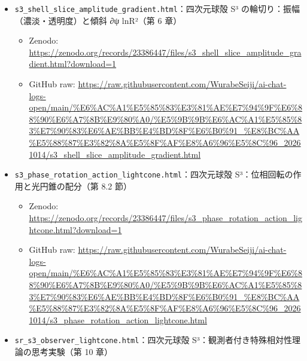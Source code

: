 \documentclass[
  a4paper,
]{ltjsarticle}
\providecommand{\tightlist}{%
  \setlength{\itemsep}{0pt}\setlength{\parskip}{0pt}}
\begin{document}
\begin{itemize}
  \begin{itemize}
  \tightlist
  \item
    Zenodo:
    \url{https://zenodo.org/records/23386447/files/sr_observer_lightcone_s1.html?download=1}
  \item
    GitHub raw:
    \url{https://raw.githubusercontent.com/WurabeSeiji/ai-chat-logs-open/main/\%E6\%AC\%A1\%E5\%85\%83\%E3\%81\%AE\%E7\%94\%9F\%E6\%88\%90\%E6\%A7\%8B\%E9\%80\%A0/\%E5\%86\%86\%E5\%91\%A8\%E4\%BD\%8F\%E6\%B0\%91_\%E5\%85\%89\%E5\%86\%86\%E9\%8C\%90\%E8\%AA\%AD\%E5\%87\%BA\%E3\%81\%97_20261014/sr_observer_lightcone_s1.html}
  \end{itemize}
\item
  \texttt{s3\_\allowbreak{}shell\_\allowbreak{}slice\_\allowbreak{}amplitude\_\allowbreak{}gradient.html}：四次元球殻 S³
  の輪切り：振幅（濃淡・透明度）と傾斜 ∂ψ ln\textbar R²\textbar（第 6
  章）

  \begin{itemize}
  \tightlist
  \item
    Zenodo:
    \url{https://zenodo.org/records/23386447/files/s3_shell_slice_amplitude_gradient.html?download=1}
  \item
    GitHub raw:
    \url{https://raw.githubusercontent.com/WurabeSeiji/ai-chat-logs-open/main/\%E6\%AC\%A1\%E5\%85\%83\%E3\%81\%AE\%E7\%94\%9F\%E6\%88\%90\%E6\%A7\%8B\%E9\%80\%A0/\%E5\%9B\%9B\%E6\%AC\%A1\%E5\%85\%83\%E7\%90\%83\%E6\%AE\%BB\%E4\%BD\%8F\%E6\%B0\%91_\%E8\%BC\%AA\%E5\%88\%87\%E3\%82\%8A\%E5\%8F\%AF\%E8\%A6\%96\%E5\%8C\%96_20261014/s3_shell_slice_amplitude_gradient.html}
  \end{itemize}
\item
  \texttt{s3\_\allowbreak{}phase\_\allowbreak{}rotation\_\allowbreak{}action\_\allowbreak{}lightcone.html}：四次元球殻
  S³：位相回転の作用と光円錐の配分（第 8.2 節）

  \begin{itemize}
  \tightlist
  \item
    Zenodo:
    \url{https://zenodo.org/records/23386447/files/s3_phase_rotation_action_lightcone.html?download=1}
  \item
    GitHub raw:
    \url{https://raw.githubusercontent.com/WurabeSeiji/ai-chat-logs-open/main/\%E6\%AC\%A1\%E5\%85\%83\%E3\%81\%AE\%E7\%94\%9F\%E6\%88\%90\%E6\%A7\%8B\%E9\%80\%A0/\%E5\%9B\%9B\%E6\%AC\%A1\%E5\%85\%83\%E7\%90\%83\%E6\%AE\%BB\%E4\%BD\%8F\%E6\%B0\%91_\%E8\%BC\%AA\%E5\%88\%87\%E3\%82\%8A\%E5\%8F\%AF\%E8\%A6\%96\%E5\%8C\%96_20261014/s3_phase_rotation_action_lightcone.html}
  \end{itemize}
\item
  \texttt{sr\_\allowbreak{}s3\_\allowbreak{}observer\_\allowbreak{}lightcone.html}：四次元球殻
  S³：観測者付き特殊相対性理論の思考実験（第 10 章）


\end{itemize}
\end{document}
